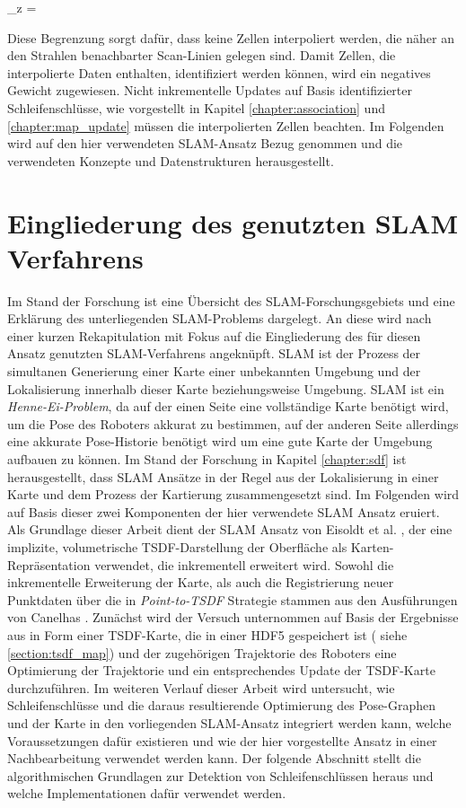 \begin{myequation}
\Delta_z = 
\end{myequation}

Diese Begrenzung sorgt dafür, dass keine Zellen interpoliert werden, die näher an den Strahlen benachbarter Scan-Linien gelegen sind. Damit Zellen, die interpolierte Daten enthalten, identifiziert werden können, wird ein negatives Gewicht zugewiesen. Nicht inkrementelle Updates auf Basis identifizierter Schleifenschlüsse, wie vorgestellt in Kapitel \ref{chapter:association} und \ref{chapter:map_update} müssen die interpolierten Zellen beachten. Im Folgenden wird auf den hier verwendeten SLAM-Ansatz Bezug genommen und die verwendeten Konzepte und Datenstrukturen herausgestellt.

\section{Eingliederung des genutzten SLAM Verfahrens}
\label{section:slam}

Im Stand der Forschung ist eine Übersicht des SLAM-Forschungsgebiets und eine Erklärung des unterliegenden SLAM-Problems dargelegt. An diese wird nach einer kurzen Rekapitulation mit Fokus auf die Eingliederung des für diesen Ansatz genutzten SLAM-Verfahrens angeknüpft. SLAM ist der Prozess der simultanen Generierung einer Karte einer unbekannten Umgebung und der Lokalisierung innerhalb dieser Karte beziehungsweise Umgebung. SLAM ist ein \emph{Henne-Ei-Problem}, da auf der einen Seite eine vollständige Karte benötigt wird, um die Pose des Roboters akkurat zu bestimmen, auf der anderen Seite allerdings eine akkurate Pose-Historie benötigt wird um eine gute Karte der Umgebung aufbauen zu können. Im Stand der Forschung in Kapitel \ref{chapter:sdf} ist herausgestellt, dass SLAM Ansätze in der Regel aus der Lokalisierung in einer Karte und dem Prozess der Kartierung zusammengesetzt sind. Im Folgenden wird auf Basis dieser zwei Komponenten der hier verwendete SLAM Ansatz eruiert. Als Grundlage dieser Arbeit dient der SLAM Ansatz von Eisoldt et al. \cite{HATSDF}, der eine implizite, volumetrische TSDF-Darstellung der Oberfläche als Karten-Repräsentation verwendet, die inkrementell erweitert wird. Sowohl die inkrementelle Erweiterung der Karte, als auch die Registrierung neuer Punktdaten über die in \emph{Point-to-TSDF} Strategie stammen aus den Ausführungen von Canelhas \cite{Canelhas2017TruncatedSD}. Zunächst wird der Versuch unternommen auf Basis der Ergebnisse aus \cite{HATSDF} in Form einer TSDF-Karte, die in einer HDF5 gespeichert ist ( siehe \ref{section:tsdf_map}) und der zugehörigen Trajektorie des Roboters eine Optimierung der Trajektorie und ein entsprechendes Update der TSDF-Karte durchzuführen. Im weiteren Verlauf dieser Arbeit wird untersucht, wie Schleifenschlüsse und die daraus resultierende Optimierung des Pose-Graphen und der Karte in den vorliegenden SLAM-Ansatz integriert werden kann, welche Voraussetzungen dafür existieren und wie der hier vorgestellte Ansatz in einer Nachbearbeitung verwendet werden kann. Der folgende Abschnitt stellt die algorithmischen Grundlagen zur Detektion von Schleifenschlüssen heraus und welche Implementationen dafür verwendet werden.

